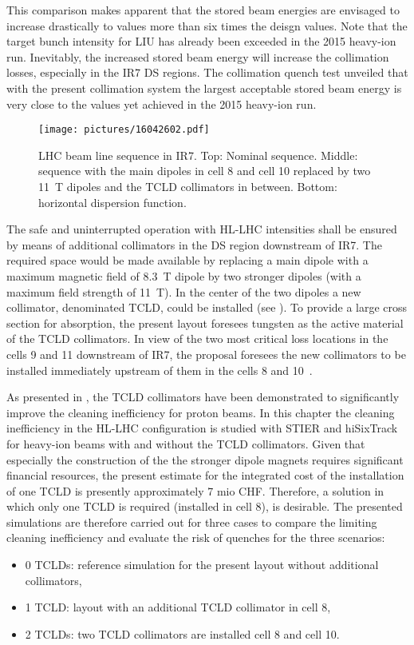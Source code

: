 This comparison makes apparent that the stored beam energies are envisaged to increase drastically to values more than six times the deisgn values. Note that the target bunch intensity for LIU has already been exceeded in the 2015 heavy-ion run. Inevitably, the increased stored beam energy will increase the collimation losses, especially in the IR7 DS regions. The collimation quench test unveiled that with the present collimation system the largest acceptable stored beam energy is very close to the values yet achieved in the 2015 heavy-ion run. 


\begin{figure}[t]  
    \centering
    \texttt{[image: pictures/16042602.pdf]}
    \caption{LHC beam line sequence in IR7. Top: Nominal sequence. Middle: sequence with the main dipoles in cell 8 and cell 10 replaced by two 11~T dipoles and the TCLD collimators in between. Bottom: horizontal dispersion function.}  
    \label{pic:16042602}
\end{figure}

The safe and uninterrupted operation with HL-LHC intensities shall be ensured by means of additional collimators in the DS region downstream of IR7. The required space would be made available by replacing a main dipole with a maximum magnetic field of 8.3~T dipole by two stronger dipoles (with a maximum field strength of 11~T). In the center of the two dipoles a new collimator, denominated TCLD, could be installed (see ). To provide a large cross section for absorption, the present layout foresees tungsten as the active material of the TCLD collimators. In view of the two most critical loss locations in the cells 9 and 11 downstream of IR7, the proposal foresees the new collimators to be installed immediately upstream of them in the cells 8 and 10~\cite{hb08:wgd08,Bruce2014}.

As presented in \cite{Bruce2014}, the TCLD collimators have been demonstrated to significantly improve the cleaning inefficiency for proton beams. In this chapter the cleaning inefficiency in the HL-LHC configuration is studied with STIER and hiSixTrack for heavy-ion beams with and without the TCLD collimators. Given that especially the construction of the the stronger dipole magnets requires significant financial resources, the present estimate for the integrated cost of the installation of one TCLD is presently approximately 7 mio CHF. Therefore, a solution in which only one TCLD is required (installed in cell 8), is desirable. The presented  simulations are therefore carried out for three cases to compare the limiting cleaning inefficiency and evaluate the risk of quenches for the three scenarios:
%
\begin{itemize}
  \item 0 TCLDs: reference simulation for the present layout without additional collimators,
  \item 1 TCLD: layout with an additional TCLD collimator in cell 8, 
  \item 2 TCLDs: two TCLD collimators are installed cell 8 and cell 10. 
\end{itemize}
%





